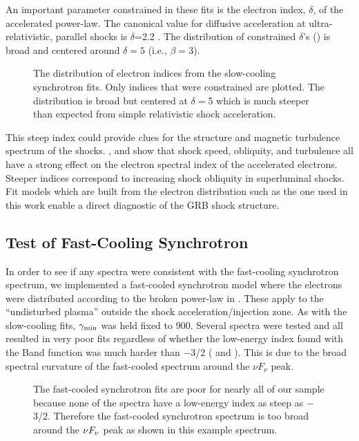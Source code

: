 An important parameter constrained in these fits is the electron
index, $\delta$, of the accelerated power-law. The canonical value for
diffusive acceleration at ultra-relativistic, parallel shocks is
$\delta$=2.2 \cite{Kirk:1987,Kirk:2000}. The distribution of
constrained $\delta$'s () is broad and centered
around $\delta=5$ (i.e., $\beta = 3$).
\begin{figure}[h!]

 \centering


  \caption{The distribution of electron indices from the slow-cooling
    synchrotron fits. Only indices that were constrained are
    plotted. The distribution is broad but centered at $\delta=$5
    which is much steeper than expected from simple relativistic shock
    acceleration.}

  \label{fig:index}

\end{figure}
This steep index could provide
clues for the structure and magnetic turbulence spectrum of the
shocks. \cite{Baring:2006}, \cite{Ellison:2004} and \cite{Baring:2012}
show that shock speed, obliquity, and turbulence all have a strong
effect on the electron spectral index of the accelerated
electrons. Steeper indices correspond to increasing shock obliquity in
superluminal shocks. Fit models which are built from the electron
distribution such as the one used in this work enable a direct
diagnostic of the GRB shock structure.






\subsection{Test of Fast-Cooling Synchrotron}
\label{sec:fast}
In order to see if any spectra were consistent with the fast-cooling
synchrotron spectrum, we implemented a fast-cooled synchrotron model
where the electrons were distributed according to the broken power-law
in . These apply to the ``undisturbed plasma''
outside the shock acceleration/injection zone. As with the
slow-cooling fits, $\gamma_{\rm min}$ was held fixed to 900. Several spectra
were tested and all resulted in very poor fits regardless of whether
the low-energy index found with the Band function was much harder than
$-$3/2 ( and ). This is due to
the broad spectral curvature of the fast-cooled spectrum around the
$\nu F_{\nu}$ peak. 
\begin{figure}

 \centering


  \caption{The fast-cooled synchrotron fits are poor for nearly all of our
    sample because none of the spectra have a low-energy
    index as steep as $-$3/2. Therefore the fast-cooled synchrotron
    spectrum is too broad around the $\nu F_{\nu}$ peak as shown in
    this example spectrum.}

  \label{fig:fastS}

\end{figure}


